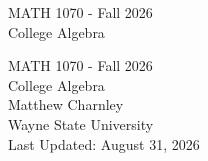 \documentclass[twoside,14pt,]{extbook}
\newcommand{\titlepagefont}{\relax}
\renewcommand{\hypertarget}[2]{#2}
\begin{document}
\raggedbottom
\frontmatter
\thispagestyle{empty}
{\titlepagefont\centering
\vspace*{0.28\textheight}
{\Huge MATH 1070 - Fall 2026}\\[2\baselineskip]
{\LARGE College Algebra}\\
}
\clearpage
\thispagestyle{empty}
\null%
\clearpage
\thispagestyle{empty}
{\titlepagefont\centering
\vspace*{0.14\textheight}
\addtocontents{toc}{\protect\label{root-1-2}\protect\hypertarget{root-1-2}{}}
{\Huge MATH 1070 - Fall 2026}\\[\baselineskip]
{\LARGE College Algebra}\\[3\baselineskip]
{\Large Matthew Charnley}\\[0.5\baselineskip]
{\Large Wayne State University}\\[3\baselineskip]
{\Large Last Updated: August 31, 2026}\\}
\clearpage
\thispagestyle{empty}
\null\clearpage
%
%
\typeout{************************************************}
\typeout{************************************************}
%
\end{document}
